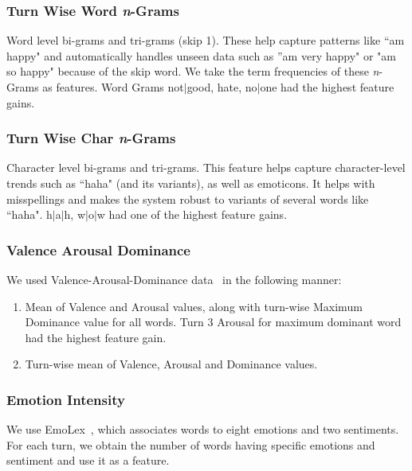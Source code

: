 \documentclass[11pt,a4paper]{article}
\begin{document}
\subsubsection{Turn Wise Word \textit{n}-Grams} \label{turnwisewordgram}
Word level bi-grams and tri-grams (skip 1). These help capture patterns like ``am happy" and automatically handles unseen data such as ''am very happy" or "am so happy" because of the skip word. We take the term frequencies of these \textit{n}-Grams as features. Word Grams not$\vert$good, hate, no$\vert$one had the highest feature gains.

\subsubsection{Turn Wise Char \textit{n}-Grams} \label{turnwisechargram}
Character level bi-grams and tri-grams. This feature helps capture character-level trends such as ``haha" (and its variants), as well as emoticons. It helps with misspellings and makes the system robust to variants of several words like ``haha". h$\vert$a$\vert$h, w$\vert$o$\vert$w had one of the highest feature gains.

\subsubsection{Valence Arousal Dominance} \label{valencearousal}
We used Valence-Arousal-Dominance data~\cite{mohammad2018obtaining} in the following manner:
\begin{enumerate}
    \item Mean of Valence and Arousal values, along with turn-wise Maximum Dominance value for all words. Turn 3 Arousal for maximum dominant word had the highest feature gain.
    \item Turn-wise mean of Valence, Arousal and Dominance values.
\end{enumerate}

\subsubsection{Emotion Intensity}\label{emotionintensity}
We use EmoLex~\cite{Mohammad2010EmotionsEB}, which associates words to eight emotions and two sentiments. For each turn, we obtain the number of words having specific emotions and sentiment and use it as a feature.
\end{document}
